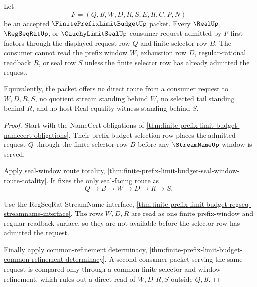 \begin{theorem}
\label{thm:finite-prefix-limit-budget-prefix-selector-totality}
Let
$$
F=(Q,B,W,D,R,S,E,H,C,P,N)
$$
be an accepted $\FinitePrefixLimitBudgetUp$ packet. Every $\RealUp$, $\RegSeqRatUp$, or $\CauchyLimitSealUp$ consumer request admitted by $F$ first factors through the displayed request row $Q$ and finite selector row $B$. The consumer cannot read the prefix window $W$, exhaustion row $D$, regular-rational readback $R$, or seal row $S$ unless the finite selector row has already admitted the request.

Equivalently, the packet offers no direct route from a consumer request to $W,D,R,S$, no quotient stream standing behind $W$, no selected tail standing behind $R$, and no host Real equality witness standing behind $S$.
\end{theorem}
\begin{proof}
Start with the NameCert obligations of \autoref{thm:finite-prefix-limit-budget-namecert-obligations}. Their prefix-budget selection row places the admitted request $Q$ through the finite selector row $B$ before any $\StreamNameUp$ window is served.

Apply seal-window route totality, \autoref{thm:finite-prefix-limit-budget-seal-window-route-totality}. It fixes the only seal-facing route as
$$
Q \to B \to W \to D \to R \to S.
$$

Use the RegSeqRat StreamName interface, \autoref{thm:finite-prefix-limit-budget-regseq-streamname-interface}. The rows $W,D,R$ are read as one finite prefix-window and regular-readback surface, so they are not available before the selector row has admitted the request.

Finally apply common-refinement determinacy, \autoref{thm:finite-prefix-limit-budget-common-refinement-determinacy}. A second consumer packet serving the same request is compared only through a common finite selector and window refinement, which rules out a direct read of $W,D,R,S$ outside $Q,B$.
\end{proof}

